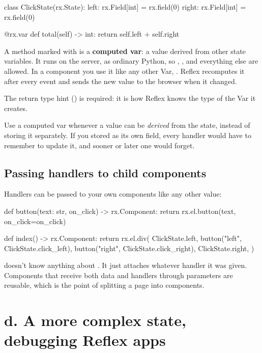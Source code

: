 \begin{py}
class ClickState(rx.State):
	left: rx.Field[int] = rx.field(0)
	right: rx.Field[int] = rx.field(0)

	@rx.var
	def total(self) -> int:
		return self.left + self.right
\end{py}

A method marked with  is a \textbf{computed var}: a value derived from other state variables. It runs on the server, as ordinary Python, so , ,  and everything else are allowed. In a component you use it like any other Var, . Reflex recomputes it after every event and sends the new value to the browser when it changed.

The return type hint () is required: it is how Reflex knows the type of the Var it creates.

Use a computed var whenever a value can be \emph{derived} from the state, instead of storing it separately. If you stored  as its own field, every handler would have to remember to update it, and sooner or later one would forget.

\subsection{Passing handlers to child components}

Handlers can be passed to your own components like any other value:

\begin{py}
def button(text: str, on_click) -> rx.Component:
	return rx.el.button(text, on_click=on_click)


def index() -> rx.Component:
	return rx.el.div(
		ClickState.left,
		button("left", ClickState.click_left),
		button("right", ClickState.click_right),
		ClickState.right,
	)
\end{py}

 doesn't know anything about . It just attaches whatever handler it was given. Components that receive both data and handlers through parameters are reusable, which is the point of splitting a page into components.

\section{d. A more complex state, debugging Reflex apps}

